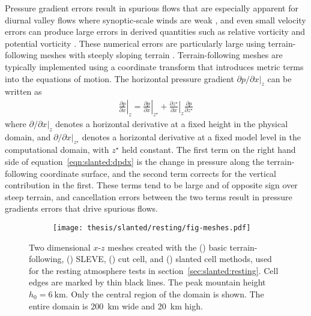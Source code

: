 Pressure gradient errors result in spurious flows that are especially apparent for diurnal valley flows where synoptic-scale winds are weak \citep{fast2003}, and even small velocity errors can produce large errors in derived quantities such as relative vorticity and potential vorticity \citep{hoinka-zaengl2004}.
These numerical errors are particularly large using terrain-following meshes with steeply sloping terrain \citep{zaengl2012}.
Terrain-following meshes are typically implemented using a coordinate transform that introduces metric terms into the equations of motion.  The horizontal pressure gradient $\left. \partial p / \partial x \right|_z$ can be written as \citep{mahrer1984}
\begin{align}
	\left. \frac{\partial p}{\partial x} \right|_z = 
	\left. \frac{\partial p}{\partial x} \right|_{z^\star} +
	\left. \frac{\partial z^\star}{\partial x} \right|_z
	\frac{\partial p}{\partial z^\star} \label{eqn:slanted:dpdx}
\end{align}
where $\left. \partial / \partial x \right|_z$ denotes a horizontal derivative at a fixed height in the physical domain, and $\left. \partial / \partial x \right|_{z^\star}$ denotes a horizontal derivative at a fixed model level in the computational domain, with $z^\star$ held constant.
The first term on the right hand side of equation~\eqref{eqn:slanted:dpdx} is the change in pressure along the terrain-following coordinate surface, and the second term corrects for the vertical contribution in the first.
These terms tend to be large and of opposite sign over steep terrain, and cancellation errors between the two terms result in pressure gradients errors that drive spurious flows.

\begin{figure}
	\centering
	\begin{subfigure}{\textwidth}
		\label{fig:slanted:resting:meshes:btf}
		\label{fig:slanted:resting:meshes:sleve}
		\label{fig:slanted:resting:meshes:cutCell}
		\label{fig:slanted:resting:meshes:slantedCell}
		\centering
		\texttt{[image: thesis/slanted/resting/fig-meshes.pdf]}
	\end{subfigure}
%
	\caption{Two dimensional $x$-$z$ meshes created with the
	() basic terrain-following,
	() SLEVE,
	() cut cell, and
	() slanted cell methods, used for the resting atmosphere tests in section~\ref{sec:slanted:resting}.  Cell edges are marked by thin black lines.  The peak mountain height $h_0 = \SI{6}{\kilo\meter}$.
	Only the central region of the domain is shown.  The entire domain is \SI{200}{\kilo\meter} wide and \SI{20}{\kilo\meter} high.}
	\label{fig:slanted:resting:meshes}
\end{figure}

